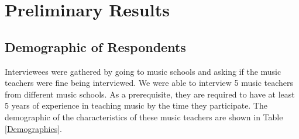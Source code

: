 %
%
%                 
\chapter{Preliminary Results}
\section{Demographic of Respondents}
Interviewees were gathered by going to music schools and asking if the music teachers were fine being interviewed. We were able to interview 5 music teachers from different music schools. As a prerequisite, they are required to have at least 5 years of experience in teaching music by the time they participate. The demographic of the characteristics of these music teachers are shown in Table \ref{Demographics}.

